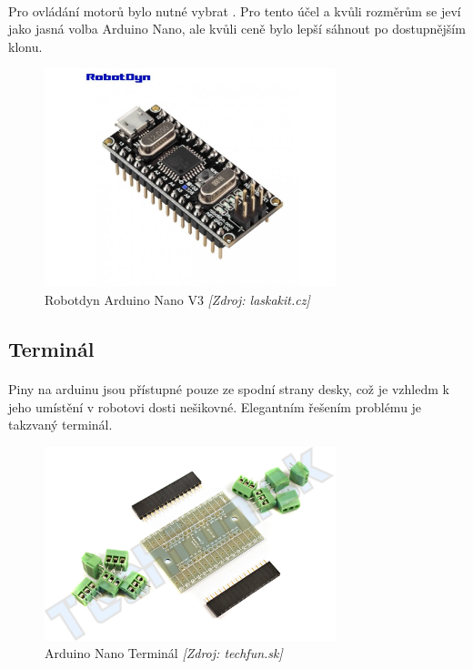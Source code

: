 \documentclass[12pt]{article}
\begin{document}
\begin{spacing}{1.5}
	\paragraph{} Pro ovládání motorů bylo nutné vybrat . Pro tento účel a kvůli rozměrům se jeví jako jasná volba Arduino Nano, ale kvůli ceně bylo lepší sáhnout po dostupnějším klonu.
	\begin{figure}[H]
		\centering
		\includegraphics[width=240pt]{robotdyn-arduino-nano-v3}
		\caption{Robotdyn Arduino Nano V3 \textit{[Zdroj: laskakit.cz]}}
		\label{fig:nano_v3}
	\end{figure}
	\subsection{Terminál}
	\paragraph{} Piny na arduinu jsou přístupné pouze ze spodní strany desky, což je vzhledm k jeho umístění v robotovi dosti nešikovné. Elegantním řešením problému je takzvaný terminál.
	\begin{figure}[H]
		\centering
		\includegraphics[width=240pt]{arduino-nano-terminal}
		\caption{Arduino Nano Terminál \textit{[Zdroj: techfun.sk]}}
		\label{fig:nano_terminal}
	\end{figure}

\end{spacing}
\end{document}
